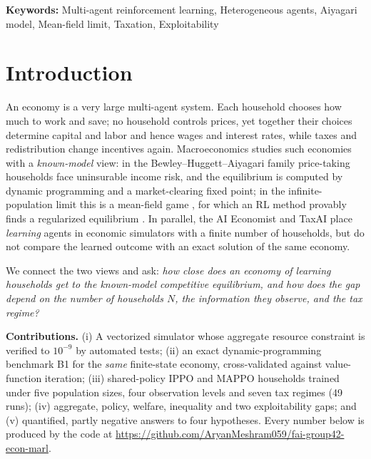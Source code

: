 \documentclass{article}
\providecommand{\keywords}[1]{\par\noindent\textbf{Keywords:} #1}
\begin{document}
\keywords{Multi-agent reinforcement learning, Heterogeneous agents, Aiyagari model, Mean-field limit, Taxation, Exploitability}

\section{Introduction}
An economy is a very large multi-agent system. Each household chooses how much to work and save; no household controls prices, yet together their choices determine capital and labor and hence wages and interest rates, while taxes and redistribution change incentives again. Macroeconomics studies such economies with a \emph{known-model} view: in the Bewley--Huggett--Aiyagari family \cite{aiyagari1994,huggett1993} price-taking households face uninsurable income risk, and the equilibrium is computed by dynamic programming and a market-clearing fixed point; in the infinite-population limit this is a mean-field game \cite{lasry2007,light2022}, for which an RL method provably finds a regularized equilibrium \cite{xu2023}. In parallel, the AI Economist \cite{zheng2022} and TaxAI \cite{mi2024taxai} place \emph{learning} agents in economic simulators with a finite number of households, but do not compare the learned outcome with an exact solution of the same economy.

We connect the two views and ask: \emph{how close does an economy of learning households get to the known-model competitive equilibrium, and how does the gap depend on the number of households $N$, the information they observe, and the tax regime?}

\textbf{Contributions.} (i) A vectorized simulator whose aggregate resource constraint is verified to $10^{-9}$ by automated tests; (ii) an exact dynamic-programming benchmark B1 for the \emph{same} finite-state economy, cross-validated against value-function iteration; (iii) shared-policy IPPO and MAPPO households trained under five population sizes, four observation levels and seven tax regimes (49 runs); (iv) aggregate, policy, welfare, inequality and two exploitability gaps; and (v) quantified, partly negative answers to four hypotheses. Every number below is produced by the code at \url{https://github.com/AryanMeshram059/fai-group42-econ-marl}.

\end{document}
